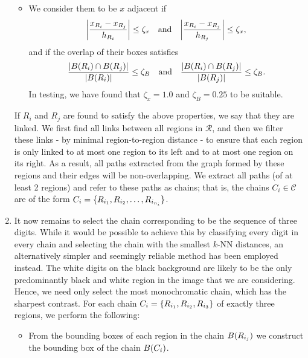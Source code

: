 \documentclass{article}
\begin{document}
\begin{enumerate}
\begin{itemize}
  \item
    We consider them to be $x$ adjacent if
    \begin{equation*}
      \lrabs[\bigg]
      {
        \frac
        {
          x_{R_{i}}
          -
          x_{R_{j}}
        }
        {
          h_{R_{i}}
        }
      }
      \leq
      \zeta_{x}
      \qq{and}
      \lrabs[\bigg]
      {
        \frac
        {
          x_{R_{i}}
          -
          x_{R_{j}}
        }
        {
          h_{R_{j}}
        }
      }
      \leq
      \zeta_{x}
      ,
    \end{equation*}
    and if the overlap of their boxes satisfies
    \begin{equation*}
      \frac
      {
        \lrabs
        {
          B\lr{R_{i}}
          \cap
          B\lr{R_{j}}
        }
      }
      {
        \lrabs
        {
          B\lr{R_{i}}
        }
      }
      \leq
      \zeta_{B}
      \qq{and}
      \frac
      {
        \lrabs
        {
          B\lr{R_{i}}
          \cap
          B\lr{R_{j}}
        }
      }
      {
        \lrabs
        {
          B\lr{R_{j}}
        }
      }
      \leq
      \zeta_{B}
      .
    \end{equation*}
    In testing, we have found that $\zeta_{x} = 1.0$ and $\zeta_{B} = 0.25$ to
    be suitable.
  \end{itemize}
  If $R_{i}$ and $R_{j}$ are found to satisfy the above properties, we say that
  they are linked.
  We first find all links between all regions in $\mathcal{R}$, and then we
  filter these links - by minimal region-to-region distance - to ensure that
  each region is only linked to at most one region to its left and to at most
  one region on its right.
  As a result, all paths extracted from the graph formed by these regions and
  their edges will be non-overlapping.
  We extract all paths (of at least 2 regions) and refer to these paths as
  chains; that is, the chains $C_{i} \in \mathcal{C}$ are of the form
  $C_{i} = \lbrace R_{i_{1}}, R_{i_{2}}, \dotsc, R_{i_{n_{i}}}\rbrace$.

\item
  \label{item:1-select-chain}
  It now remains to select the chain corresponding to be the sequence of three
  digits.
  While it would be possible to achieve this by classifying every digit in every
  chain and selecting the chain with the smallest $k$-NN distances, an
  alternatively simpler and seemingly reliable method has been employed instead.
  The white digits on the black background are likely to be the only
  predominantly black and white region in the image that we are considering.
  Hence, we need only select the most monochromatic chain, which has the
  sharpest contrast.
  For each chain $C_{i} = \lbrace R_{i_{1}}, R_{i_{2}}, R_{i_{3}}\rbrace$ of
  exactly three regions, we perform the following:
  \begin{itemize}
  \item
    From the bounding boxes of each region in the chain $B(R_{i_{j}})$ we
    construct the bounding box of the chain $B(C_{i})$.


\end{itemize}
\end{enumerate}
\end{document}
